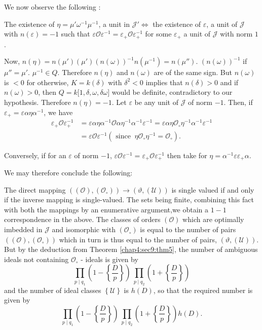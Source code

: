  We now observe the following :

 The existence of $ \eta = \mu' \omega^{-1} \mu^{-1} $, a unit in $
 \mathcal{J}' \Longleftrightarrow $ the  existence of  $ \varepsilon
 $, a unit of $ \mathcal{J} $ with $ n (\varepsilon) = -1 $ such that
 $ \varepsilon \mathscr{O} \varepsilon^{-1} = \varepsilon_+
 \mathscr{O} \varepsilon_+^{-1} $ for some $ \varepsilon_+ $  a unit
 of $ \mathcal{J} $ with norm $1$. 
 
Now, $ n ( \eta ) = n (\mu ')  (\mu') (n ( \omega))^{-1} n (
  \mu^{-1} ) = n(\mu'')$. $(n ( \omega ))^{-1} $ if $ \mu'' =
  \mu'$. $ \mu^{-1} \in  Q $. Therefore $ n ( \eta ) $ and $ n (
  \omega) $ are of the same sign. But $ n ( \omega) $ is $ < 0 $ for
  otherwise, $ K = k (\delta) $ with $ \delta^2 < 0 $ implies that  $
  n (\delta) > 0 $ and if $ n ( \omega) > 0 $, then $ Q = k \big [ 1,
    \delta,  \omega, \delta \omega \big ] $ would be definite,
  contradictory to our hypothesis. Therefore $ n ( \eta )= -1  $. Let
  $\varepsilon$ be any unit of $ \mathcal{J} $ of  norm $-1$. Then, if
  $ \varepsilon_+ = \varepsilon \alpha \eta \alpha^{-1} $, we have  
  \begin{align*}
    \varepsilon_+ \mathscr{O} \varepsilon_+^{-1} &=  \varepsilon
    \alpha \eta \alpha^{-1} \mathscr{O} \alpha \eta^{-1}
    \alpha^{-1} \varepsilon^{-1} = \varepsilon \alpha \eta
    \mathscr{O}_\circ \eta^{-1} \alpha^{-1} \varepsilon^{-1} \\ 
    &= \varepsilon \mathscr{O} \varepsilon^{-1} ( \text { since }  ~
    \eta\mathscr{O}_\circ \eta^{-1} = \mathscr{O}_\circ ).
  \end{align*} 
 
 Conversely, if for an $ \varepsilon $ of norm $ -1$, $ \varepsilon
 \mathscr{O} \varepsilon^{-1} = \varepsilon_+ \mathscr{O}
 \varepsilon_+^{-1} $ then take for $ \eta = \alpha^{-1} \varepsilon
 \varepsilon_+ \alpha $. 
 
 We may therefore conclude the following:
 
 The direct mapping $ (( \mathscr{O}), ( \mathscr{O}_\circ ))
 \rightarrow ( \vartheta, (\mathscr{U} )) $ is single valued if and
 only if the inverse mapping is single-valued. The sets  being finite,
 combining this fact with both the mappings by an enumerative
 argument,\pageoriginale we obtain a $1-1$  correspondence in the above. The classes
 of orders $ ( \mathscr{O} ) $ which are optimally imbedded in $
 \mathcal{J} $ and isomorphic with  $ ( \mathscr{O}_\circ ) $ is equal
 to the number of pairs $ (( \mathscr{O}), ( \mathscr{O}_\circ )) $
 which in  turn is thus equal to the number of pairs, $ ( \vartheta, (
 \mathscr{U} )) $. But by the  deduction from
 Theorem \ref{chap4:sec9:thm5}, the number 
 of ambiguous ideals not containing $ \mathscr{O}_\circ $ - ideals is
 given by  
 $$
 \prod_{p \mid q_1}  \left( 1 - \left\{ \frac{D}{p} \right\} \right) ~ \prod_{p
   \mid q_2}  \left( 1 + \left\{ \frac{D}{p} \right\} \right) 
 $$ 
 and the number of ideal classes $ \left\{ \mathscr{U} \right\} $ is $ h
 (D) $, so that the required number is given by  
  $$
 \prod_{p \mid q_1}  \left( 1 - \left\{ \frac{D}{p} \right\} \right) ~ \prod_{p
   \mid q_2}  \left( 1 + \left \{ \frac{D}{p} \right \}\right) h (D). 
 $$
 
